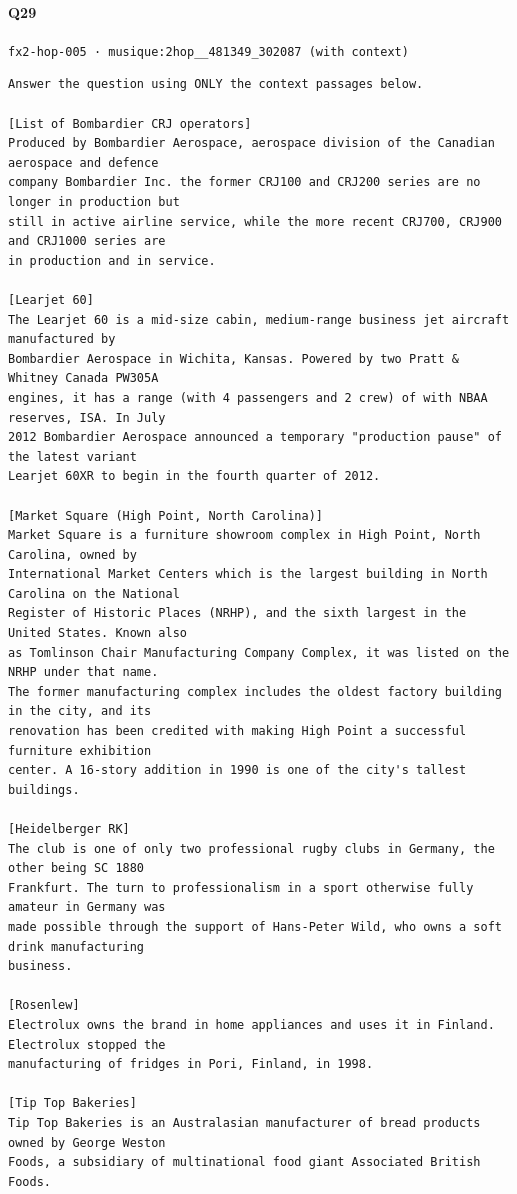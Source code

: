 \documentclass[10pt]{article}
\begin{document}
\paragraph{Q29} \texttt{fx2-hop-005  ·  musique:2hop\_\_481349\_302087 (with context)}
\begin{verbatim}
Answer the question using ONLY the context passages below.

[List of Bombardier CRJ operators]
Produced by Bombardier Aerospace, aerospace division of the Canadian aerospace and defence
company Bombardier Inc. the former CRJ100 and CRJ200 series are no longer in production but
still in active airline service, while the more recent CRJ700, CRJ900 and CRJ1000 series are
in production and in service.

[Learjet 60]
The Learjet 60 is a mid-size cabin, medium-range business jet aircraft manufactured by
Bombardier Aerospace in Wichita, Kansas. Powered by two Pratt & Whitney Canada PW305A
engines, it has a range (with 4 passengers and 2 crew) of with NBAA reserves, ISA. In July
2012 Bombardier Aerospace announced a temporary "production pause" of the latest variant
Learjet 60XR to begin in the fourth quarter of 2012.

[Market Square (High Point, North Carolina)]
Market Square is a furniture showroom complex in High Point, North Carolina, owned by
International Market Centers which is the largest building in North Carolina on the National
Register of Historic Places (NRHP), and the sixth largest in the United States. Known also
as Tomlinson Chair Manufacturing Company Complex, it was listed on the NRHP under that name.
The former manufacturing complex includes the oldest factory building in the city, and its
renovation has been credited with making High Point a successful furniture exhibition
center. A 16-story addition in 1990 is one of the city's tallest buildings.

[Heidelberger RK]
The club is one of only two professional rugby clubs in Germany, the other being SC 1880
Frankfurt. The turn to professionalism in a sport otherwise fully amateur in Germany was
made possible through the support of Hans-Peter Wild, who owns a soft drink manufacturing
business.

[Rosenlew]
Electrolux owns the brand in home appliances and uses it in Finland. Electrolux stopped the
manufacturing of fridges in Pori, Finland, in 1998.

[Tip Top Bakeries]
Tip Top Bakeries is an Australasian manufacturer of bread products owned by George Weston
Foods, a subsidiary of multinational food giant Associated British Foods.


\end{verbatim}
\end{document}
